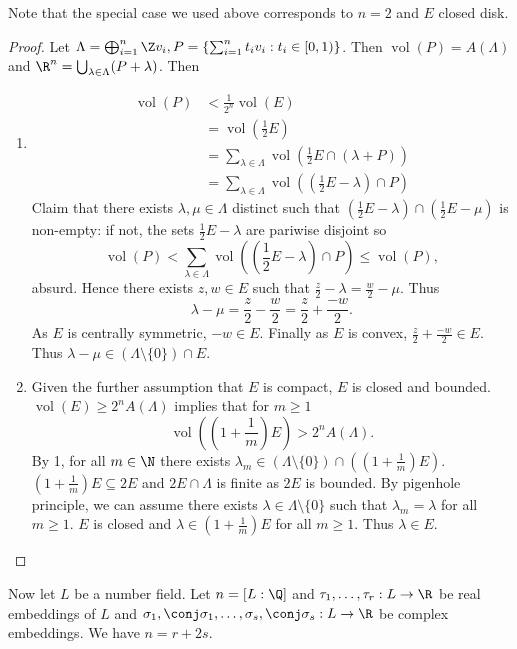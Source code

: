 \documentclass[a4paper]{article}
\DeclareMathOperator{\vol}{vol}
\begin{document}
Note that the special case we used above corresponds to \(n = 2\) and \(E\) closed disk.

\begin{proof}
  Let \(\Lambda = \bigoplus_{i = 1}^n \Z v_i, P = \left\{ \sum_{i = 1}^n t_iv_i: t_i \in [0, 1) \right\}\). Then \(\vol(P) = A(\Lambda)\) and \(\R^n = \bigcup_{\lambda \in \Lambda} (P + \lambda)\). Then
  \begin{enumerate}
  \item
    \begin{align*}
      \vol(P)
      &< \frac{1}{2^n} \vol(E) \\
      &= \vol(\frac{1}{2}E) \\
      &= \sum_{\lambda \in \Lambda} \vol(\frac{1}{2}E \cap (\lambda + P)) \\
      &= \sum_{\lambda \in \Lambda} \vol((\frac{1}{2}E - \lambda) \cap P)
    \end{align*}
    Claim that there exists \(\lambda, \mu \in \Lambda\) distinct such that \((\frac{1}{2}E - \lambda) \cap (\frac{1}{2}E - \mu)\) is non-empty: if not, the sets \(\frac{1}{2}E - \lambda\) are pariwise disjoint so
    \[
      \vol(P) < \sum_{\lambda \in \Lambda} \vol((\frac{1}{2}E - \lambda) \cap P) \leq \vol(P),
    \]
    absurd. Hence there exists \(z, w \in E\) such that \(\frac{z}{2} - \lambda = \frac{w}{2} - \mu\). Thus
    \[
      \lambda - \mu = \frac{z}{2} - \frac{w}{2} = \frac{z}{2} + \frac{-w}{2}.
    \]
    As \(E\) is centrally symmetric, \(-w \in E\). Finally as \(E\) is convex, \(\frac{z}{2} + \frac{-w}{2} \in E\). Thus \(\lambda - \mu \in (\Lambda \setminus \{0\}) \cap E\).
  \item Given the further assumption that \(E\) is compact, \(E\) is closed and bounded. \(\vol(E) \geq 2^n A(\Lambda)\) implies that for \(m \geq 1\)
    \[
      \vol((1 + \frac{1}{m})E) > 2^n A(\Lambda).
    \]
    By 1, for all \(m \in \N\) there exists \(\lambda_m \in (\Lambda \setminus \{0\}) \cap ((1 + \frac{1}{m})E)\). \((1 + \frac{1}{m}) E \subseteq 2E\) and \(2E \cap \Lambda\) is finite as \(2E\) is bounded. By pigenhole principle, we can assume there exists \(\lambda \in \Lambda \setminus \{0\}\) such that \(\lambda_m = \lambda\) for all \(m \geq 1\). \(E\) is closed and \(\lambda \in (1 + \frac{1}{m})E\) for all \(m \geq 1\). Thus \(\lambda \in E\).
  \end{enumerate}
\end{proof}

Now let \(L\) be a number field. Let \(n = [L:\Q]\) and \(\tau_1, \dots, \tau_r: L \to \R\) be real embeddings of \(L\) and \(\sigma_1, \conj \sigma_1, \dots, \sigma_s, \conj \sigma_s: L \to \R\) be complex embeddings. We have \(n = r + 2s\).
\end{document}
